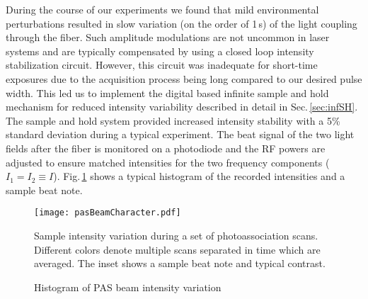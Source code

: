 During the course of our experiments we found that mild environmental perturbations resulted in slow variation (on the order of 1\,s) of the light coupling through the fiber.
Such amplitude modulations are not uncommon in laser systems and are typically compensated by using a closed loop intensity stabilization circuit. 
However, this circuit was inadequate for short-time exposures due to the acquisition process being long compared to our desired pulse width.
This led us to implement the digital based infinite sample and hold mechanism for reduced intensity variability described in detail in Sec.\,\ref{sec:infSH}. 
The sample and hold system provided increased intensity stability with a 5\% standard deviation during a typical experiment. 
The beat signal of the two light fields after the fiber is monitored on a photodiode and the RF powers are adjusted to ensure matched intensities for the two frequency components ($I_1 = I_2 \equiv I$).
Fig.\,\ref{fig:PASbeamStability} shows a typical histogram of the recorded intensities and a sample beat note.
	\begin{figure}
		\centerline{
		\texttt{[image: pasBeamCharacter.pdf]}}
		\caption{Histogram of PAS beam intensity variation}{Sample intensity variation during a set of photoassociation scans. Different colors denote multiple scans separated in time which are averaged. The inset shows a sample beat note and typical contrast.}
		\label{fig:PASbeamStability}
	\end{figure} 

%

%
%
%
%

